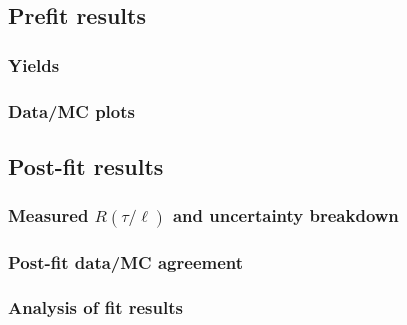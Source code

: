 
\subsection{Prefit results}
\label{sec:prefit_results}

\subsubsection{Yields}
\label{sec:prefit_results_yields}

\subsubsection{Data/MC plots}
\label{sec:prefit_results_dataMC_plots}

\subsection{Post-fit results}
\label{sec:postfit_results}

\subsubsection{Measured $R(\tau/\ell)$ and uncertainty breakdown}
\label{sec:postfit_results_Measured_r_and_and_uncertainty_breakdown}

\subsubsection{Post-fit data/MC agreement}
\label{sec:postfit_results_dataMC_agreement}

\subsubsection{Analysis of fit results}
\label{sec:postfit_results_analysis_of_fit_results}
